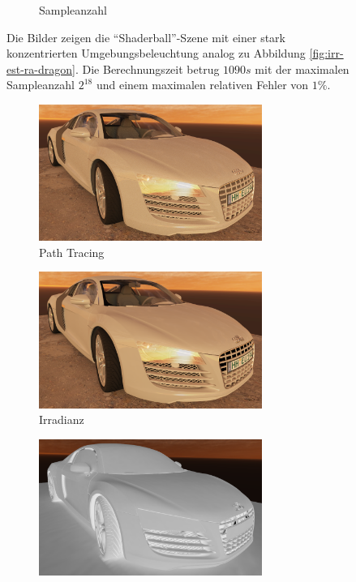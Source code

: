 \begin{figure}[h]
\begin{subfigure}[t]{\textwidth}
			\caption{Sampleanzahl}
		\end{subfigure}
		\caption[Dritte adaptive Vertex-Irradiance-Map anhand der \enquote{Shaderball}-Szene]{Die Bilder zeigen die \enquote{Shaderball}-Szene mit einer stark konzentrierten Umgebungsbeleuchtung analog zu Abbildung \ref{fig:irr-est-ra-dragon}. Die Berechnungszeit betrug $1090\unit{s}$ mit der maximalen Sampleanzahl $2^{18}$ und einem maximalen relativen Fehler von $1\unit{\%}$.}
		\label{fig:irr-est-ra-shaderball3}
	\end{figure}

	\begin{figure}[h]
		\begin{subfigure}[t]{\textwidth}
			\center
			\includegraphics[width=0.8\textwidth]{pic/irr_est-ra-r8-ref.png}
			\caption{Path Tracing}
		\end{subfigure}
		\begin{subfigure}[t]{\textwidth}
			\center
			\includegraphics[width=0.8\textwidth]{pic/irr_est-ra-r8-irr.png}
			\caption{Irradianz}
		\end{subfigure}
		\begin{subfigure}[t]{\textwidth}
			\center
			\includegraphics[width=0.8\textwidth]{pic/irr_est-ra-r8-scount.png}

\end{subfigure}
\end{figure}
